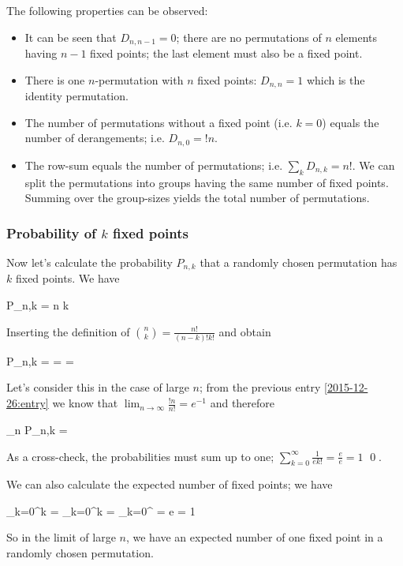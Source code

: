 The following properties can be observed:

\begin{itemize}
\item  It can be seen that $D_{n,n-1} = 0$; there are no permutations of $n$ elements having $n-1$ fixed points; the last element must also be a fixed point.
\item  There is one $n$-permutation with $n$ fixed points: $D_{n,n} = 1$ which is the identity permutation.
\item  The number of permutations without a fixed point (i.e. $k=0$) equals the number of derangements; i.e. $D_{n,0} = !n$.
\item  The row-sum equals the number of permutations; i.e. $\sum_{k} D_{n,k} = n!$. We can split the permutations into groups having the same number of fixed points. Summing over the group-sizes yields the total number of permutations.
\end{itemize}

\subsubsection{Probability of $k$ fixed points}

Now let's calculate the probability $P_{n,k}$ that a randomly chosen permutation has $k$ fixed points. We have

\bee
P_{n,k} = {n \choose k} 
\eee

Inserting the definition of ${n \choose k} = \frac{n!}{(n-k)! k!}$ and obtain

\bee
P_{n,k} =   =  =  
\eee

Let's consider this in the case of large $n$; from the previous entry \ref{2015-12-26:entry} we know that $\lim_{n \rightarrow \infty} \frac{!n}{n!} = e^{-1}$ and therefore

\bee
\lim_{n \rightarrow \infty} P_{n,k} = 
\eee

As a cross-check, the probabilities must sum up to one; $\sum_{k=0}^\infty \frac{1}{e k!} = \frac{e}{e} = 1$ \qed.

We can also calculate the expected number of fixed points; we have

\bee
\sum_{k=0}^\infty k  =  \sum_{k=0}^\infty k  =  \sum_{k=0}^\infty {} =  e = 1
\eee

So in the limit of large $n$, we have an expected number of one fixed point in a randomly chosen permutation.


